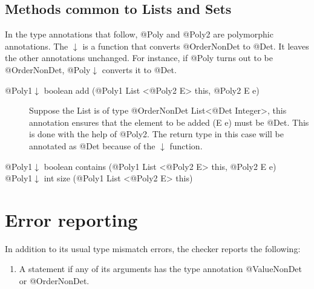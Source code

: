 \subsection{Methods common to Lists and Sets\label{nondeterminism-library-annotations-methods}}
In the type annotations that follow, @Poly and @Poly2 are polymorphic annotations. The $\downarrow$ is a function
that converts @OrderNonDet to @Det. It leaves the other annotations unchanged. For instance, if @Poly turns out to be
@OrderNonDet, @Poly$\downarrow$ converts it to @Det. 
\begin{description}
	\item[@Poly1$\downarrow$  boolean add (@Poly1 List <@Poly2 E> this, @Poly2 E e)] Suppose the List is of
	type @OrderNonDet List<@Det Integer>, this annotation ensures that the element to be added (E e) must be @Det. This is
	done with the help of @Poly2. The return type in this case will be annotated as @Det because of the $\downarrow$ function.
	\item[@Poly1$\downarrow$  boolean contains (@Poly1 List <@Poly2 E> this, @Poly2 E e)] 
	\item[@Poly1$\downarrow$  int size (@Poly1 List <@Poly2 E> this)] 
\end{description}

\section{Error reporting\label{nondeterminism-error-reporting}}
In addition to its usual type mismatch errors, the checker reports the following:
\begin{enumerate}
	\item A  statement if any of its arguments has the type annotation @ValueNonDet or @OrderNonDet.	
\end{enumerate}
